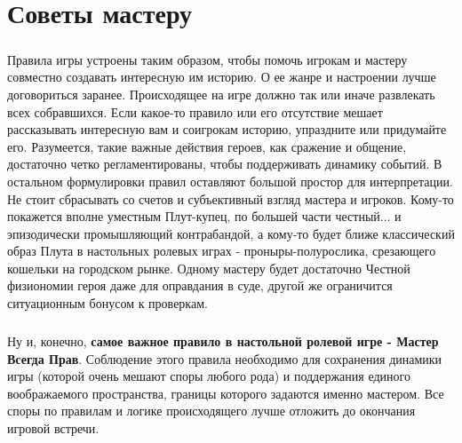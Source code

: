 \chapter{Советы мастеру}
\paragraph{}
Правила игры устроены таким образом, чтобы помочь игрокам и мастеру совместно создавать интересную им историю. О ее жанре и настроении лучше договориться заранее. Происходящее на игре должно так или иначе развлекать всех собравшихся. Если какое-то правило или его отсутствие мешает рассказывать интересную вам и соигрокам историю, упраздните или придумайте его. Разумеется, такие важные действия героев, как сражение и общение, достаточно четко регламентированы, чтобы поддерживать динамику событий. В остальном формулировки правил оставляют большой простор для интерпретации. Не стоит сбрасывать со счетов и субъективный взгляд мастера и игроков. Кому-то покажется вполне уместным Плут-купец, по большей части честный... и эпизодически промышляющий контрабандой, а кому-то будет ближе классический образ Плута в настольных ролевых играх - проныры-полурослика, срезающего кошельки на городском рынке. Одному мастеру будет достаточно Честной физиономии героя даже для оправдания в суде, другой же ограничится ситуационным бонусом к проверкам.
\paragraph{}
Ну и, конечно, \textbf{самое важное правило в настольной ролевой игре - Мастер Всегда Прав}. Соблюдение этого правила необходимо для сохранения динамики игры (которой очень мешают споры любого рода) и поддержания единого воображаемого пространства, границы которого задаются именно мастером. Все споры по правилам и логике происходящего лучше отложить до окончания игровой встречи.





